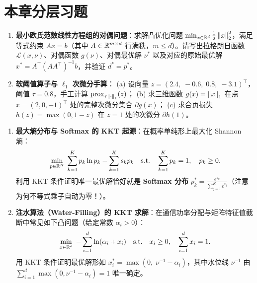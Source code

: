 \section*{本章分层习题}

\begin{enumerate}[label=\textbf{4.2.\arabic*}, leftmargin=3.3em, itemsep=5pt]
  \item\label{ex:4.2.1} \textbf{最小欧氏范数线性方程组的对偶问题}：求解凸优化问题 $\min_{x\in\mathbb{R}^d} \frac{1}{2}\left\|x\right\|_2^2$，满足等式约束 $Ax = b$（其中 $A \in \mathbb{R}^{m\times d}$ 行满秩，$m \le d$）。请写出拉格朗日函数 $\mathcal{L}(x, \nu)$、对偶函数 $g(\nu)$、对偶最优解 $\nu^*$ 以及对应的原始最优解 $x^* = A^\top (AA^\top)^{-1} b$，并验证 $d^* = p^*$。

  \item\label{ex:4.2.2} \textbf{软阈值算子与 $\ell_1$ 次微分手算}：
  (a) 设向量 $z = (2.4,\; -0.6,\; 0.8,\; -3.1)^\top$，阈值 $\tau = 0.8$，手工计算 $\operatorname{prox}_{\tau\left\|\cdot\right\|_1}(z)$；
  (b) 求三维函数 $g(x) = \left\|x\right\|_1$ 在点 $x = (2, 0, -1)^\top$ 处的完整次微分集合 $\partial g(x)$；
  (c) 求合页损失 $h(z) = \max(0, 1 - z)$ 在 $z = 1$ 处的次微分 $\partial h(1)$。
\end{enumerate}

\begin{enumerate}[label=\textbf{4.2.\arabic*}, leftmargin=3.3em, itemsep=5pt, start=3]
  \item\label{ex:4.2.3} \textbf{最大熵分布与 Softmax 的 KKT 起源}：在概率单纯形上最大化 Shannon 熵：
  \[
    \min_{p \in \mathbb{R}^K}\; \sum_{k=1}^K p_k \ln p_k - \sum_{k=1}^K s_k p_k
    \quad\text{s.t.}\quad \sum_{k=1}^K p_k = 1,\quad p_k \ge 0.
  \]
  利用 KKT 条件证明唯一最优解恰好就是 \textbf{Softmax 分布} $p_k^* = \frac{e^{s_k}}{\sum_{j=1}^K e^{s_j}}$（注意为何不等式乘子自动为零！）。

  \item\label{ex:4.2.4} \textbf{注水算法（Water-Filling）的 KKT 求解}：在通信功率分配与矩阵特征值截断中常见如下凸问题（给定常数 $\alpha_i > 0$）：
  \[
    \min_{x \in \mathbb{R}^d}\; -\sum_{i=1}^d \ln(\alpha_i + x_i) \quad\text{s.t.}\quad x_i \ge 0,\quad \sum_{i=1}^d x_i = 1.
  \]
  用 KKT 条件证明最优解形如 $x_i^* = \max(0,\; \nu^{-1} - \alpha_i)$，其中水位线 $\nu^{-1}$ 由 $\sum_{i=1}^d \max(0, \nu^{-1}-\alpha_i) = 1$ 唯一确定。
\end{enumerate}

